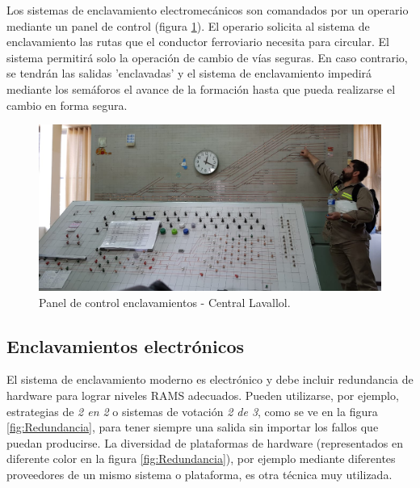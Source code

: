 			\vspace{7cm}
			
			Los sistemas de enclavamiento electromecánicos son comandados por un operario mediante un panel de control (figura \ref{fig:Electromecanico}). El operario solicita al sistema de enclavamiento las rutas que el conductor ferroviario necesita para circular. El sistema permitirá solo la operación de cambio de vías seguras. En caso contrario, se tendrán las salidas 'enclavadas' y el sistema de enclavamiento impedirá mediante los semáforos el avance de la formación hasta que pueda realizarse el cambio en forma segura.
		
			\begin{figure}[h!]
				\centering
				\includegraphics[scale=.27]{./Figures/Electromecanico}
				\caption{Panel de control enclavamientos - Central Lavallol.}
				\label{fig:Electromecanico}
			\end{figure}
		
			
		
		\subsection{Enclavamientos electrónicos}
		\label{sec:Redundancia}	
			
			El sistema de enclavamiento moderno es electrónico y debe incluir redundancia de hardware para lograr niveles RAMS adecuados. Pueden utilizarse, por ejemplo, estrategias de \emph{2 en 2} o sistemas de votación \emph{2 de 3},  como se ve en la figura \ref{fig:Redundancia}, para tener siempre una salida sin importar los fallos que puedan producirse\citep{REDUNDANCIA}. La diversidad de plataformas de hardware (representados en diferente color en la figura \ref{fig:Redundancia}), por ejemplo mediante diferentes proveedores de un mismo sistema o plataforma, es otra técnica muy utilizada.
			
